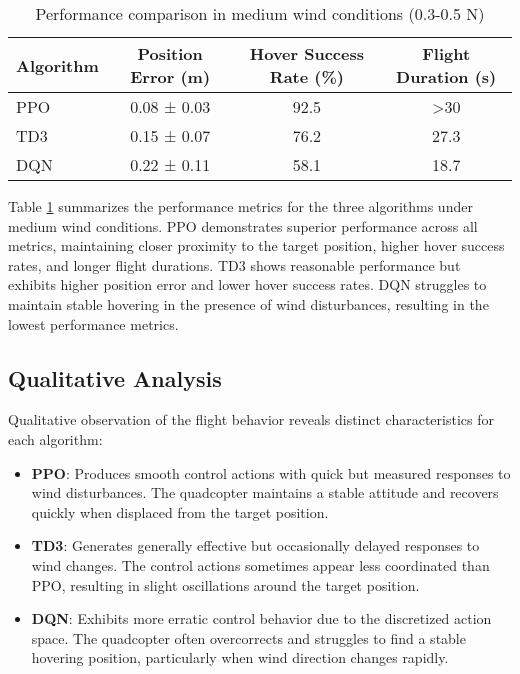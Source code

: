 \documentclass[12pt]{article}
\begin{document}
\begin{table}[htbp]
\centering
\caption{Performance comparison in medium wind conditions (0.3-0.5 N)}
\begin{tabular}{lccc}
\toprule
Algorithm & Position Error (m) & Hover Success Rate (\%) & Flight Duration (s) \\
\midrule
PPO & 0.08 ± 0.03 & 92.5 & >30 \\
TD3 & 0.15 ± 0.07 & 76.2 & 27.3 \\
DQN & 0.22 ± 0.11 & 58.1 & 18.7 \\
\bottomrule
\end{tabular}
\label{tab:wind_performance}
\end{table}

Table \ref{tab:wind_performance} summarizes the performance metrics for the three algorithms under medium wind conditions. PPO demonstrates superior performance across all metrics, maintaining closer proximity to the target position, higher hover success rates, and longer flight durations. TD3 shows reasonable performance but exhibits higher position error and lower hover success rates. DQN struggles to maintain stable hovering in the presence of wind disturbances, resulting in the lowest performance metrics.

\subsection{Qualitative Analysis}

Qualitative observation of the flight behavior reveals distinct characteristics for each algorithm:

\begin{itemize}
    \item \textbf{PPO}: Produces smooth control actions with quick but measured responses to wind disturbances. The quadcopter maintains a stable attitude and recovers quickly when displaced from the target position.
    
    \item \textbf{TD3}: Generates generally effective but occasionally delayed responses to wind changes. The control actions sometimes appear less coordinated than PPO, resulting in slight oscillations around the target position.
    
    \item \textbf{DQN}: Exhibits more erratic control behavior due to the discretized action space. The quadcopter often overcorrects and struggles to find a stable hovering position, particularly when wind direction changes rapidly.
\end{itemize}
\end{document}
